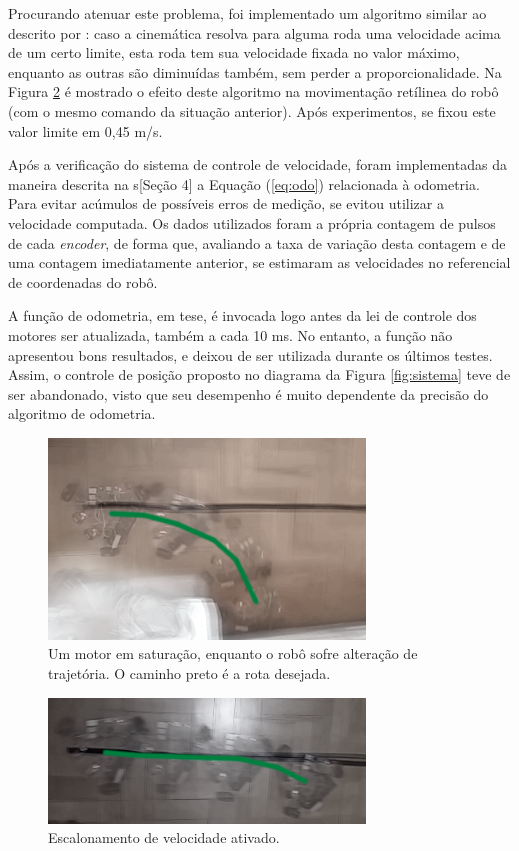 Procurando atenuar este problema, foi implementado um algoritmo similar ao descrito por \citet{indiveri2009swedish}: caso a cinemática resolva para alguma roda uma velocidade acima de um certo limite, esta roda tem sua velocidade fixada no valor máximo, enquanto as outras são diminuídas também, sem perder a proporcionalidade. Na Figura \ref{fig:scaling_on} é mostrado o efeito deste algoritmo na movimentação retílinea do robô (com o mesmo comando da situação anterior). Após experimentos, se fixou este valor limite em 0,45 m/s.

Após a verificação do sistema de controle de velocidade, foram implementadas da maneira descrita na s\hyperref[sec:software][Seção 4] a Equação (\ref{eq:odo}) relacionada à odometria. Para evitar acúmulos de possíveis erros de medição, se evitou utilizar a velocidade computada. Os dados utilizados foram a própria contagem de pulsos de cada \textit{encoder}, de forma que, avaliando a taxa de variação desta contagem e de uma contagem imediatamente anterior, se estimaram as velocidades no referencial de coordenadas do robô.

A função de odometria, em tese, é invocada logo antes da lei de controle dos motores ser atualizada, também a cada 10 ms. No entanto, a função não apresentou bons resultados, e deixou de ser utilizada durante os últimos testes. Assim, o controle de posição proposto no diagrama da Figura \ref{fig:sistema} teve de ser abandonado, visto que seu desempenho é muito dependente da precisão do algoritmo de odometria.

\begin{figure}[ht!]
  \centering
  \includegraphics[width = 0.75\textwidth]{imagens/scaling_off}
  \caption{Um motor em saturação, enquanto o robô sofre alteração de trajetória. O caminho preto é a rota desejada.}
  \label{fig:scaling_off}
\end{figure}

\begin{figure}[h!]
  \centering
  \includegraphics[width = 0.75\textwidth]{imagens/scaling_on}
  \caption{Escalonamento de velocidade ativado.}
  \label{fig:scaling_on}
\end{figure}

